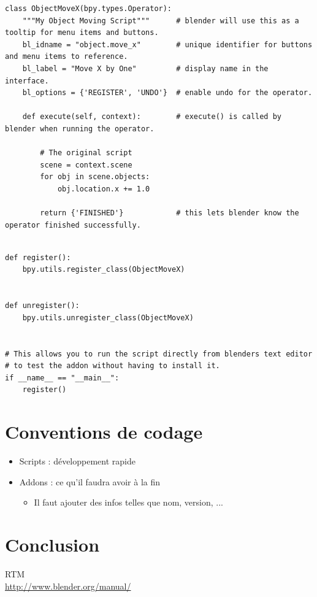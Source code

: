 \documentclass[11pt,usenames,dvipsnames]{beamer}
\begin{document}
\begin{frame}[fragile]
  \begin{lstlisting}
class ObjectMoveX(bpy.types.Operator):
    """My Object Moving Script"""      # blender will use this as a tooltip for menu items and buttons.
    bl_idname = "object.move_x"        # unique identifier for buttons and menu items to reference.
    bl_label = "Move X by One"         # display name in the interface.
    bl_options = {'REGISTER', 'UNDO'}  # enable undo for the operator.

    def execute(self, context):        # execute() is called by blender when running the operator.

        # The original script
        scene = context.scene
        for obj in scene.objects:
            obj.location.x += 1.0

        return {'FINISHED'}            # this lets blender know the operator finished successfully.
  \end{lstlisting}
\end{frame}

\begin{frame}[fragile]
  \begin{lstlisting}

def register():
    bpy.utils.register_class(ObjectMoveX)


def unregister():
    bpy.utils.unregister_class(ObjectMoveX)


# This allows you to run the script directly from blenders text editor
# to test the addon without having to install it.
if __name__ == "__main__":
    register()
  \end{lstlisting}
\end{frame}

\section{Conventions de codage}


\begin{frame}
  \begin{itemize}
    \item Scripts : développement rapide
    \item Addons : ce qu'il faudra avoir à la fin
      \begin{itemize}
      \item Il faut ajouter des infos telles que nom, version, ...
      \end{itemize}

  \end{itemize}
\end{frame}

\section{Conclusion}
\begin{frame}
  RTM\\
  \url{http://www.blender.org/manual/}
\end{frame}
\end{document}
